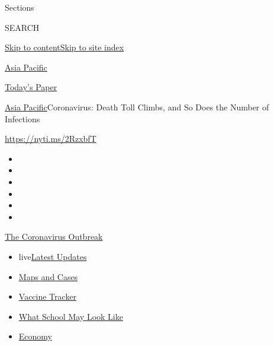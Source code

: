 Sections

SEARCH

\protect\hyperlink{site-content}{Skip to
content}\protect\hyperlink{site-index}{Skip to site index}

\href{https://www.nytimes.com/section/world/asia}{Asia Pacific}

\href{https://myaccount.nytimes.com/auth/login?response_type=cookie\&client_id=vi}{}

\href{https://www.nytimes.com/section/todayspaper}{Today's Paper}

\href{/section/world/asia}{Asia Pacific}\textbar{}Coronavirus: Death
Toll Climbs, and So Does the Number of Infections

\url{https://nyti.ms/2RzxbfT}

\begin{itemize}
\item
\item
\item
\item
\item
\item
\end{itemize}

\href{https://www.nytimes.com/news-event/coronavirus?action=click\&pgtype=Article\&state=default\&region=TOP_BANNER\&context=storylines_menu}{The
Coronavirus Outbreak}

\begin{itemize}
\tightlist
\item
  live\href{https://www.nytimes.com/2020/08/02/world/coronavirus-updates.html?action=click\&pgtype=Article\&state=default\&region=TOP_BANNER\&context=storylines_menu}{Latest
  Updates}
\item
  \href{https://www.nytimes.com/interactive/2020/us/coronavirus-us-cases.html?action=click\&pgtype=Article\&state=default\&region=TOP_BANNER\&context=storylines_menu}{Maps
  and Cases}
\item
  \href{https://www.nytimes.com/interactive/2020/science/coronavirus-vaccine-tracker.html?action=click\&pgtype=Article\&state=default\&region=TOP_BANNER\&context=storylines_menu}{Vaccine
  Tracker}
\item
  \href{https://www.nytimes.com/interactive/2020/07/29/us/schools-reopening-coronavirus.html?action=click\&pgtype=Article\&state=default\&region=TOP_BANNER\&context=storylines_menu}{What
  School May Look Like}
\item
  \href{https://www.nytimes.com/live/2020/07/31/business/stock-market-today-coronavirus?action=click\&pgtype=Article\&state=default\&region=TOP_BANNER\&context=storylines_menu}{Economy}
\end{itemize}

